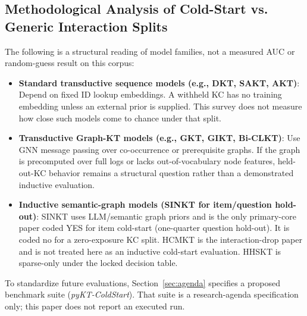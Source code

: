 \documentclass[lettersize,journal]{IEEEtran}
\begin{document}
\subsection{Methodological Analysis of Cold-Start vs. Generic Interaction Splits}
The following is a structural reading of model families, not a measured AUC or random-guess result on this corpus:
\begin{itemize}
    \item \textbf{Standard transductive sequence models (e.g., DKT, SAKT, AKT)}: Depend on fixed ID lookup embeddings. A withheld KC has no training embedding unless an external prior is supplied. This survey does not measure how close such models come to chance under that split.
    \item \textbf{Transductive Graph-KT models (e.g., GKT, GIKT, Bi-CLKT)}: Use GNN message passing over co-occurrence or prerequisite graphs. If the graph is precomputed over full logs or lacks out-of-vocabulary node features, held-out-KC behavior remains a structural question rather than a demonstrated inductive evaluation.
    \item \textbf{Inductive semantic-graph models (SINKT for item/question hold-out)}: SINKT \cite{KT044_SINKT_2024} uses LLM/semantic graph priors and is the only primary-core paper coded YES for item cold-start (one-quarter question hold-out). It is coded no for a zero-exposure KC split. HCMKT \cite{HCMKT_2026} is the interaction-drop paper and is not treated here as an inductive cold-start evaluation. HHSKT is sparse-only under the locked decision table.
\end{itemize}
To standardize future evaluations, Section~\ref{sec:agenda} specifies a proposed benchmark suite (\emph{pyKT-ColdStart}). That suite is a research-agenda specification only; this paper does not report an executed run.
\end{document}

